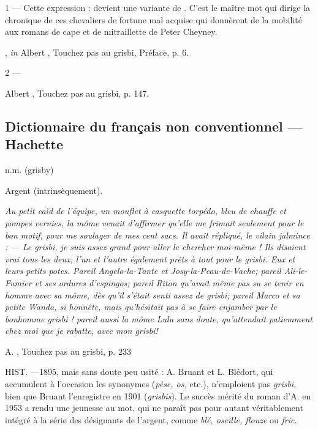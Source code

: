 1 --- Cette expression :  devient une variante de . C'est le maître mot qui dirige la chronique de ces chevaliers de fortune mal acquise qui donnèrent de la mobilité aux romans de cape et de mitraillette de Peter Cheyney.

			, \emph{in} Albert , Touchez pas au grisbi, Préface, p. 6.

2 --- 

			Albert , Touchez pas au grisbi, p. 147.


\subsection*{Dictionnaire du français non conventionnel --- Hachette}

n.m. (grisby)

Argent (intrinsèquement).

\emph{Au petit caïd de l'équipe, un mouflet à casquette torpédo, bleu de chauffe et pompes vernies, la môme venait d'affirmer qu'elle me frimait seulement pour le bon motif, pour me soulager de mes cent sacs. Il avait répliqué, le vilain jalmince : --- Le \emph{grisbi}, je suis assez grand pour aller le chercher moi-même !
Ils disaient vrai tous les deux, l'un et l'autre également prêts à tout pour le \emph{grisbi}. Eux et leurs petits potes. Pareil Angelo-la-Tante et Josy-la-Peau-de-Vache; pareil Ali-le-Fumier et ses ordures d'espingos; pareil Riton qu'avait même pas su se tenir en homme avec sa môme, dès qu'il s'était senti assez de \emph{grisbi}; pareil Marco et sa petite Wanda, si honnête, mais qu'hésitait pas à se faire enjamber par le bonhomme \emph{grisbi} ! pareil aussi la môme Lulu sans doute, qu'attendait patiemment chez moi que je rabatte, avec mon \emph{grisbi}!}

			A. , Touchez pas au grisbi, p. 233

HIST. ---1895, mais sans doute peu usité : A. Bruant et L. Blédort, qui accumulent à l'occasion les synonymes (\emph{pèse, os,} etc.), n'emploient pas \emph{grisbi}, bien que Bruant l'enregistre en 1901 (\emph{grisbis}). Le succès mérité du roman d'A.  en 1953 a rendu une jeunesse au mot, qui ne paraît pas pour autant véritablement intégré à la série des désignants de l'argent, comme \emph{blé, oseille, flouze} ou \emph{fric}.

